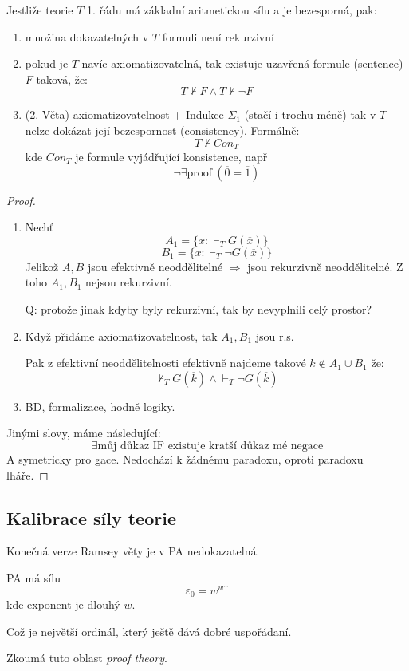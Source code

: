 \begin{theorem}\label{godel}
	Jestliže teorie $T$ 1. řádu má základní aritmetickou sílu a je bezesporná, pak:
	\begin{enumerate}
		\item množina dokazatelných v $T$ formuli není rekurzivní
		\item pokud je $T$ navíc axiomatizovatelná, tak existuje uzavřená formule (sentence) $F$ taková, že:
			\[ T \nvdash F \land T \nvdash \neg F \]
		\item (2. Věta) axiomatizovatelnost + Indukce $\Sigma_1$ (stačí i trochu méně) tak v $T$ nelze dokázat její bezespornost (consistency).
		Formálně:
		\[ T \nvdash Con_T \]
		kde $Con_T$ je formule vyjádřující konsistence, např
		\[ \neg \exists \text{proof}\ (\overline{0} = \overline{1}) \]
	\end{enumerate}
\end{theorem}
\begin{proof}
	\begin{enumerate}
		\item Nechť
			\[ A_1 = \{ x: \vdash_T G(\overline{x}) \} \]
			\[ B_1 = \{ x: \vdash_T \neg G(\overline{x}) \} \]
			Jelikož $A, B$ jsou efektivně neoddělitelné $\Rightarrow$ jsou rekurzivně neoddělitelné.
			Z toho $A_1, B_1$ nejsou rekurzivní.

			Q: protože jinak kdyby byly rekurzivní, tak by nevyplnili celý prostor?
		\item Když přidáme axiomatizovatelnost, tak $A_1, B_1$  jsou r.s.

			Pak z efektivní neoddělitelnosti efektivně najdeme takové $k \notin A_1 \cup B_1$ že:
			\[ \nvdash_T G(\overline{k}) \land \vdash_T \neg G(\overline{k}) \]
		\item BD, formalizace, hodně logiky.
	\end{enumerate}

	Jinými slovy, máme následující:
	\[ \exists \text{můj důkaz IF existuje kratší důkaz mé negace} \]
	A symetricky pro gace. Nedochází k žádnému paradoxu, oproti paradoxu lháře.
\end{proof}

\subsection{Kalibrace síly teorie}

\begin{note}
	Konečná verze Ramsey věty je v PA nedokazatelná.
\end{note}

\begin{note}
	PA má sílu
	\[ \varepsilon_0 = w^{w^{\ldots}} \]
	kde exponent je dlouhý $w$.

	Což je největší ordinál, který ještě dává dobré uspořádaní.

	Zkoumá tuto oblast \emph{proof theory}.
\end{note}

